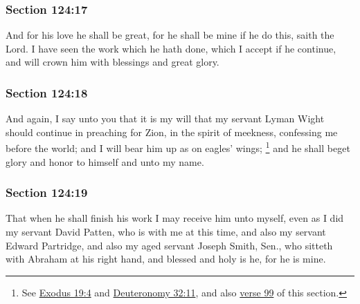 	\subsubsection{Section 124:17} %
		\label{DC124-17}

		And for his love he shall be great, for he shall be mine if he do this, saith the Lord.  I have seen the work which he hath done, which I accept if he continue, and will crown him with blessings and great glory.


	\subsubsection{Section 124:18} %
		\label{DC124-18}

		And again, I say unto you that it is my will that my servant Lyman Wight should continue in preaching for Zion, in the spirit of meekness, confessing me before the world; and I will bear him up as on eagles' wings;%
			\footnote{%
				See \hyperref[EXODUS-19-4]{Exodus 19:4} and \hyperref[DEUTERONOMY-32-11]{Deuteronomy 32:11}, and also \hyperref[DC124-99]{verse 99} of this section.
				}
		and he shall beget glory and honor to himself and unto my name.


	\subsubsection{Section 124:19} %
		\label{DC124-19}

		That when he shall finish his work I may receive him unto myself, even as I did my servant David Patten, who is with me at this time, and also my servant Edward Partridge, and also my aged servant Joseph Smith, Sen., who sitteth with Abraham at his right hand, and blessed and holy is he, for he is mine.

